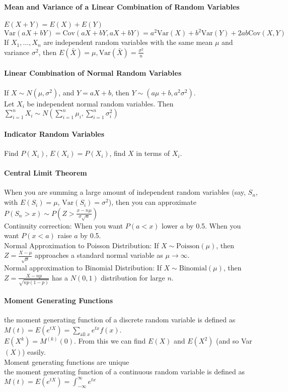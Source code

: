 \documentclass[10pt,letter]{article}
\begin{document}
\paragraph{Mean and Variance of a Linear Combination of Random Variables}
$E(X+Y)=E(X)+E(Y)$ \\ 
$\text{Var}(aX+bY)=\text{Cov}(aX+bY,aX+bY)=a^2\text{Var}(X)+b^2\text{Var}(Y)+2ab\text{Cov}(X,Y)$ \\ 
If $X_1,\ldots,X_n$ are independent random variables with the same mean $\mu$ and variance $\sigma^2$, then $E(\bar{X})=\mu,\text{Var}(\bar{X})=\frac{\sigma^2}{n}$

\paragraph{Linear Combination of Normal Random Variables}
If $X\sim N(\mu,\sigma^2)$, and $Y=aX+b$, then $Y\sim(a\mu+b,a^2\sigma^2)$.\\ 
Let $X_i$ be independent normal random variables. Then $\sum_{i=1}^nX_i\sim N(\sum_{i=1}^n\mu_i,\sum_{i=1}^n\sigma^2_i)$ 

\paragraph{Indicator Random Variables}
Find $P(X_i)$, $E(X_i)=P(X_i)$, find $X$ in terms of $X_i$. 

\paragraph{Central Limit Theorem}
When you are summing a large amount of independent random variables (say, $S_n$, with $E(S_i)=\mu$, $\text{Var}(S_i)=\sigma^2$), then you can approximate $P(S_n>x)\sim P\left(Z>\frac{x-n\mu}{\sigma\sqrt{n}}\right)$ \\ 
Continuity correction: When you want $P(a<x)$ lower $a$ by 0.5. When you want $P(x<a)$ raise $a$ by 0.5. \\ 
Normal Approximation to Poisson Distribution: If $X\sim \text{Poisson}(\mu)$, then $Z=\frac{X-\mu}{\sqrt{\mu}}$ approaches a standard normal variable as $\mu\rightarrow\infty$. \\ 
Normal approximation to Binomial Distribution: If $X\sim\text{Binomial}(\mu)$, then $Z=\frac{X-np}{\sqrt{np(1-p)}}$ has a $N(0,1)$ distribution for large $n$. \\ 

\paragraph{Moment Generating Functions}
the moment generating function of a discrete random variable is defined as $M(t)=E(e^{tX})=\sum_{\text{all }x}e^{tx}f(x)$. \\ 
$E(X^k)=M^{(k)}(0)$. From this we can find $E(X)$ and $E(X^2)$ (and so Var$(X)$) easily.\\ 
Moment generating functions are unique\\ 
the moment generating function of a continuous random variable is defined as $M(t)=E(e^{tX})=\int_{-\infty}^\infty e^{tx}$
\end{document}
